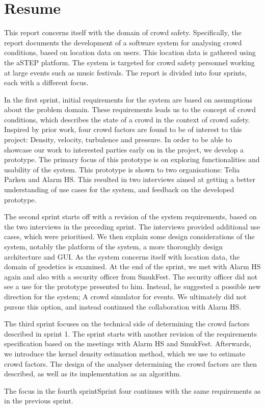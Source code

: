 \chapter*{Resume}

This report concerns itself with the domain of crowd safety. Specifically, the report documents the development of a software system for analysing crowd conditions, based on location data on users. This location data is gathered using the aSTEP platform. The system is targeted for crowd safety personnel working at large events such as music festivals. The report is divided into four sprints, each with a different focus.

In the first sprint, initial requirements for the system are based on assumptions about the problem domain. These requirements leads us to the concept of crowd conditions, which describes the state of a crowd in the context of crowd safety. Inspired by prior work, four crowd factors are found to be of interest to this project: Density, velocity, turbulence and pressure. In order to be able to showcase our work to interested parties early on in the project, we develop a prototype. The primary focus of this prototype is on exploring functionalities and usability of the system. This prototype is shown to two organisations: Telia Parken and Alarm HS. This resulted in two interviews aimed at getting a better understanding of use cases for the system, and feedback on the developed prototype.

The second sprint starts off with a revision of the system requirements, based on the two interviews in the preceding sprint. The interviews provided additional use cases, which were prioritised. We then explain some design considerations of the system, notably the platform of the system, a more thoroughly design architecture and GUI. As the system concerns itself with location data, the domain of geodetics is examined. At the end of the sprint, we met with Alarm HS again and also with a security officer from SmukFest. The security officer did not see a use for the prototype presented to him. Instead, he suggested a possible new direction for the system; A crowd simulator for events. We ultimately did not pursue this option, and instead continued the collaboration with Alarm HS.

The third sprint focuses on the technical side of determining the crowd factors described in sprint 1. The sprint starts with another revision of the requirements specification based on the meetings with Alarm HS and SmukFest. Afterwards, we introduce the kernel density estimation method, which we use to estimate crowd factors. The design of the analyser determining the crowd factors are then described, as well as its implementation as an algorithm.

The focus in the fourth sprintSprint four continues with the same requirements as in the previous sprint. 

